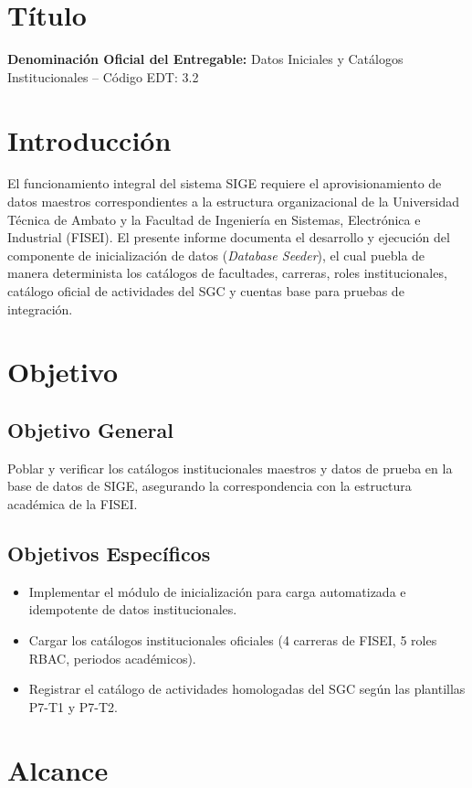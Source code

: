 \documentclass[12pt,a4paper]{article}
\begin{document}
\section{Título}
\textbf{Denominación Oficial del Entregable:} Datos Iniciales y Catálogos Institucionales -- Código EDT: 3.2

\section{Introducción}
El funcionamiento integral del sistema SIGE requiere el aprovisionamiento de datos maestros correspondientes a la estructura organizacional de la Universidad Técnica de Ambato y la Facultad de Ingeniería en Sistemas, Electrónica e Industrial (FISEI). El presente informe documenta el desarrollo y ejecución del componente de inicialización de datos (\textit{Database Seeder}), el cual puebla de manera determinista los catálogos de facultades, carreras, roles institucionales, catálogo oficial de actividades del SGC y cuentas base para pruebas de integración.

\section{Objetivo}
\subsection{Objetivo General}
Poblar y verificar los catálogos institucionales maestros y datos de prueba en la base de datos de SIGE, asegurando la correspondencia con la estructura académica de la FISEI.
\subsection{Objetivos Específicos}
\begin{itemize}[leftmargin=1.5em, itemsep=2pt]
    \item Implementar el módulo de inicialización para carga automatizada e idempotente de datos institucionales.
    \item Cargar los catálogos institucionales oficiales (4 carreras de FISEI, 5 roles RBAC, periodos académicos).
    \item Registrar el catálogo de actividades homologadas del SGC según las plantillas P7-T1 y P7-T2.
\end{itemize}

\section{Alcance}
\end{document}
